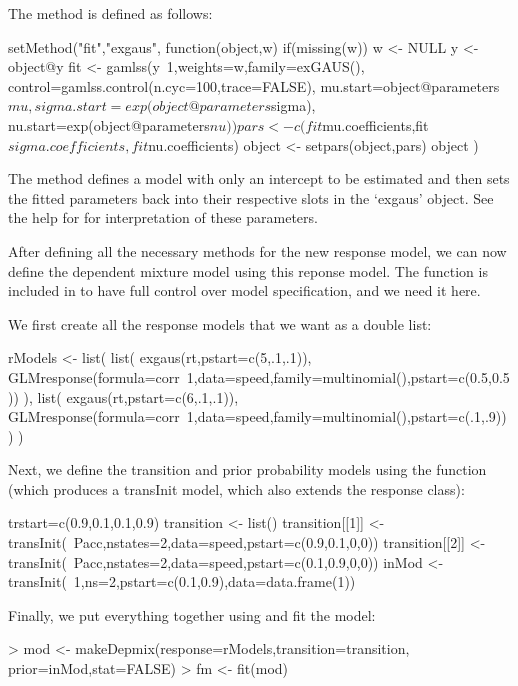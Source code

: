 \documentclass[article]{jss}
\begin{document}
The  method is defined as follows: 
\begin{CodeChunk}
\begin{CodeInput}
setMethod("fit","exgaus",
  function(object,w) {
    if(missing(w)) w <- NULL
    y <- object@y
    fit <- gamlss(y~1,weights=w,family=exGAUS(),
      control=gamlss.control(n.cyc=100,trace=FALSE),
      mu.start=object@parameters$mu,
      sigma.start=exp(object@parameters$sigma),
      nu.start=exp(object@parameters$nu))
    pars <- c(fit$mu.coefficients,fit$sigma.coefficients,fit$nu.coefficients)
    object <- setpars(object,pars)
    object
  }
)
\end{CodeInput}
\end{CodeChunk}

The  method defines a  model with 
only an intercept to be estimated and then sets the fitted parameters 
back into their respective slots in the `exgaus' object. See the help 
for  for interpretation of these parameters. 

After defining all the necessary methods for the new response model, 
we can  now define the dependent mixture model using this reponse model. 
The function  is included in  to have 
full control over model specification, and we need it here. 

We first create all the response models that we want as a double list: 
\begin{CodeChunk}
\begin{CodeInput}
rModels <- list(
  list(
    exgaus(rt,pstart=c(5,.1,.1)),
    GLMresponse(formula=corr~1,data=speed,family=multinomial(),pstart=c(0.5,0.5))
  ),
  list(
    exgaus(rt,pstart=c(6,.1,.1)),
    GLMresponse(formula=corr~1,data=speed,family=multinomial(),pstart=c(.1,.9))
  )
)
\end{CodeInput}
\end{CodeChunk}
Next, we define the transition and prior probability models using the 
 function (which produces a transInit model, which also extends 
the response class): 
\begin{CodeChunk}
\begin{CodeInput}
trstart=c(0.9,0.1,0.1,0.9)
transition <- list()
transition[[1]] <- transInit(~Pacc,nstates=2,data=speed,pstart=c(0.9,0.1,0,0))
transition[[2]] <- transInit(~Pacc,nstates=2,data=speed,pstart=c(0.1,0.9,0,0))
inMod <- transInit(~1,ns=2,pstart=c(0.1,0.9),data=data.frame(1))
\end{CodeInput}
\end{CodeChunk}
Finally, we put everything together using  and fit 
the model: 
\begin{CodeChunk}
\begin{CodeInput}
> mod <- makeDepmix(response=rModels,transition=transition,
    prior=inMod,stat=FALSE)
> fm <- fit(mod)
\end{CodeInput}
\end{CodeChunk}
\end{document}
